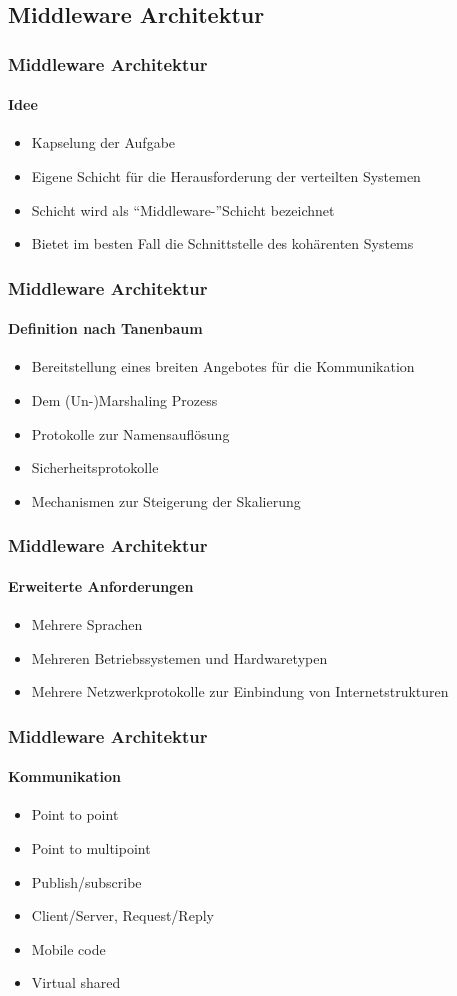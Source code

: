 \subsection{Middleware Architektur}
\begin{frame}
  \frametitle{Middleware Architektur}
  \framesubtitle{Idee}
  \begin{itemize}
    \item Kapselung der Aufgabe
    \item Eigene Schicht für die Herausforderung der verteilten Systemen 
    \item Schicht wird als \enquote{Middleware-}Schicht bezeichnet
    \item Bietet im besten Fall die Schnittstelle des kohärenten Systems
  \end{itemize}
\end{frame}

\begin{frame}
  \frametitle{Middleware Architektur}
  \framesubtitle{Definition nach Tanenbaum}
  \begin{itemize}
    \item Bereitstellung eines breiten Angebotes für die Kommunikation
    \item Dem (Un-)Marshaling Prozess 
    \item Protokolle zur Namensauflösung
    \item Sicherheitsprotokolle
    \item Mechanismen zur Steigerung der Skalierung
  \end{itemize}
\end{frame}

\begin{frame}
  \frametitle{Middleware Architektur}
  \framesubtitle{Erweiterte Anforderungen}
  \begin{itemize}
    \item Mehrere Sprachen
    \item Mehreren Betriebssystemen und Hardwaretypen
    \item Mehrere Netzwerkprotokolle zur Einbindung von Internetstrukturen
  \end{itemize}
\end{frame}

\begin{frame}
  \frametitle{Middleware Architektur}
  \framesubtitle{Kommunikation}
  \begin{itemize}
    \item Point to point
    \item Point to multipoint
    \item Publish/subscribe
    \item Client/Server, Request/Reply
    \item Mobile code
    \item Virtual shared
  \end{itemize}
\end{frame}

